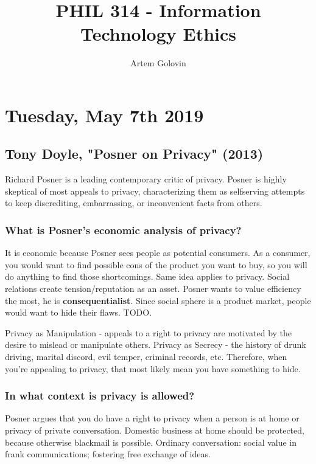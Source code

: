 \documentclass{article}
\title{PHIL 314 - Information Technology Ethics}
\author{Artem Golovin}
\begin{document}
\maketitle
\tableofcontents
\newpage


\section{Tuesday, May 7th 2019}


\subsection{Tony Doyle, "Posner on Privacy" (2013)}

Richard Posner is a leading contemporary critic of privacy. Posner
is highly skeptical of most appeals to privacy, characterizing them as selfserving
attempts to keep discrediting, embarrassing, or inconvenient facts
from others.

\subsubsection{What is Posner's economic analysis of privacy?}

It is economic because Posner sees people as potential consumers. As a consumer, you would want to find possible cons of the product you want to buy, so you will do anything to find those shortcomings. Same idea applies to privacy. Social relations create tension/reputation as an asset. Posner wants to value efficiency the most, he is \textbf{consequentialist}. Since social sphere is a product market, people would want to hide their flaws. TODO.

Privacy as Manipulation - appeals to a right to privacy are motivated by the desire to mislead or manipulate others. Privacy as Secrecy - the history of drunk driving, marital discord, evil temper, criminal records, etc. Therefore, when you're appealing to privacy, that most likely mean you have something to hide.

\subsubsection{In what context is privacy is allowed?}

Posner argues that you do have a right to privacy when a person is at home or privacy of private conversation. Domestic business at home should be protected, because otherwise blackmail is possible. Ordinary conversation: social value in frank communications; fostering free exchange of ideas.
\end{document}
